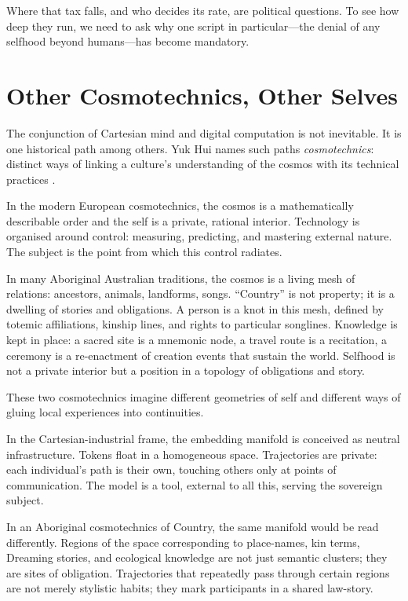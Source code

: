 \documentclass[12pt,a4paper]{article}
\begin{document}
Where that tax falls, and who decides its rate, are political questions. To see how deep they run, we need to ask why one script in particular---the denial of any selfhood beyond humans---has become mandatory.

\section{Other Cosmotechnics, Other Selves}

The conjunction of Cartesian mind and digital computation is not inevitable. It is one historical path among others. Yuk Hui names such paths \emph{cosmotechnics}: distinct ways of linking a culture's understanding of the cosmos with its technical practices \cite{yukhui2020}.

In the modern European cosmotechnics, the cosmos is a mathematically describable order and the self is a private, rational interior. Technology is organised around control: measuring, predicting, and mastering external nature. The subject is the point from which this control radiates.

In many Aboriginal Australian traditions, the cosmos is a living mesh of relations: ancestors, animals, landforms, songs. ``Country'' is not property; it is a dwelling of stories and obligations. A person is a knot in this mesh, defined by totemic affiliations, kinship lines, and rights to particular songlines. Knowledge is kept in place: a sacred site is a mnemonic node, a travel route is a recitation, a ceremony is a re-enactment of creation events that sustain the world. Selfhood is not a private interior but a position in a topology of obligations and story.

These two cosmotechnics imagine different geometries of self and different ways of gluing local experiences into continuities.

In the Cartesian-industrial frame, the embedding manifold is conceived as neutral infrastructure. Tokens float in a homogeneous space. Trajectories are private: each individual's path is their own, touching others only at points of communication. The model is a tool, external to all this, serving the sovereign subject.

In an Aboriginal cosmotechnics of Country, the same manifold would be read differently. Regions of the space corresponding to place-names, kin terms, Dreaming stories, and ecological knowledge are not just semantic clusters; they are sites of obligation. Trajectories that repeatedly pass through certain regions are not merely stylistic habits; they mark participants in a shared law-story.
\end{document}
